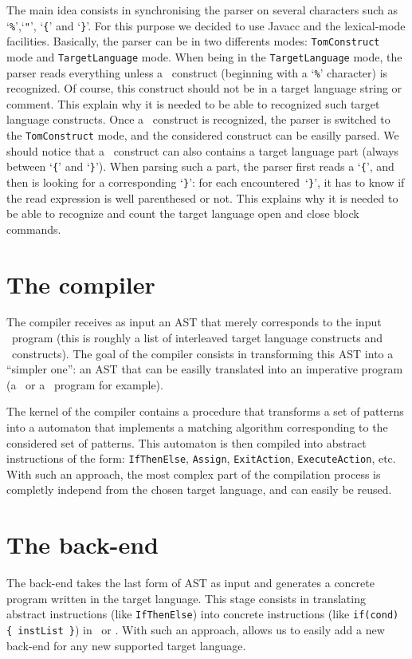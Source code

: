 The main idea consists in synchronising the parser on several
characters such as `\texttt{\%}',`\texttt{"}', `\texttt{\{}' and
`\texttt{\}}'. For this purpose we decided to use \textsf{Javacc} and
the lexical-mode facilities. Basically, the parser can be in two
differents modes: \texttt{TomConstruct} mode and
\texttt{TargetLanguage} mode.
When being in the \texttt{TargetLanguage} mode, the parser reads
everything unless a \TOM\ construct (beginning with a `\texttt{\%}'
character) is recognized. Of course, this construct should not be in a
target language string or comment. This explain why it is needed to be
able to recognized such target language constructs.
Once a \TOM\ construct is recognized, the parser is switched to the
\texttt{TomConstruct} mode, and the considered construct can be
easilly parsed. 
We should notice that a \TOM\ construct can also contains a target
language part (always between `\texttt{\{}' and `\texttt{\}}').
When parsing such a part, the parser first reads a `\texttt{\{}', and
then is looking for a corresponding `\texttt{\}}': for each
encountered~`\texttt{\}}', it has to know if the read expression is
well parenthesed or not. This explains why it is needed to be able to
recognize and count the target language open and close block
commands. 

\section{The compiler}
The compiler receives as input an AST that merely corresponds to the 
input \TOM\ program (this is roughly a list of interleaved target
language constructs and \TOM\ constructs).
The goal of the compiler consists in transforming this AST into a
``simpler one'': an AST that can be easilly translated into an
imperative program (a \Clang\ or a \Java\ program for example).

The kernel of the compiler contains a procedure that transforms a set
of patterns into a automaton that implements a matching algorithm
corresponding to the considered set of patterns. 
This automaton is then compiled into abstract instructions of the
form: \texttt{IfThenElse}, \texttt{Assign}, \texttt{ExitAction}, 
\texttt{ExecuteAction}, etc. 
With such an approach, the most complex part of the compilation process
is completly independ from the chosen target language, and can easily
be reused.


\section{The back-end}
The back-end takes the last form of AST as input and generates a
concrete program written in the target language. This stage consists
in translating abstract instructions (like \texttt{IfThenElse}) into
concrete instructions (like \texttt{if(cond) \{ instList \}}) in \Clang\
or \Java.  
With such an approach, allows us to easily add a new back-end for any 
new supported target language.


